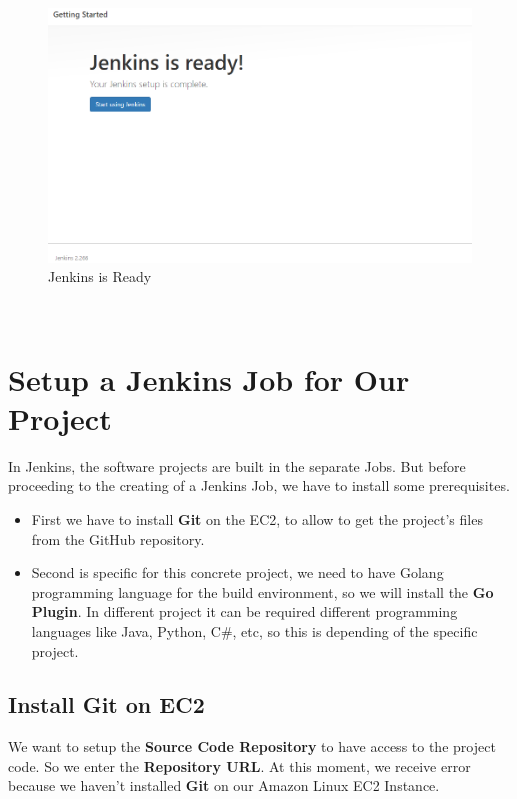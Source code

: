 \documentclass[12pt,a4paper,twoside]{article}
\begin{document}
\begin{figure}[H]
    \centering
        \includegraphics[width=15cm]{images-aws/26-jenkins-ready.png}
        \caption{Jenkins is Ready}
\end{figure}


~\newpage


\section{Setup a Jenkins Job for Our Project}


In Jenkins, the software projects are built in the separate Jobs. 
But before proceeding to the creating of a Jenkins Job, we have to install some prerequisites. 


\begin{itemize}
	\item First we have to install \textbf{Git} on the EC2, to allow to get the project's files from the GitHub repository.

	\item Second is specific for this concrete project, we need to have Golang programming language for the build environment, so we will install the \textbf{Go Plugin}. In different project it can be required different programming languages like Java, Python, C\#, etc, so this is depending of the specific project.
\end{itemize}


\subsection{Install Git on EC2}


We want to setup the \textbf{Source Code Repository} to have access to the project code. So we enter the \textbf{Repository URL}.
At this moment, we receive error because we haven't installed \textbf{Git} on our  Amazon Linux EC2 Instance.
\end{document}

